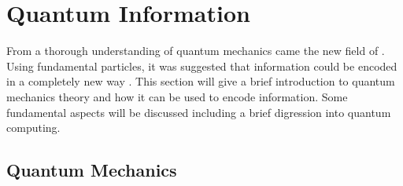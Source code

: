 %
%
%

\section{Quantum Information}

From a thorough understanding of quantum mechanics came the new field of . Using fundamental particles, it was suggested that information could be encoded in a completely new way \cite{manin1980computable, feynman1982simulating}. This section will give a brief introduction to quantum mechanics theory and how it can be used to encode information. Some fundamental aspects will be discussed including a brief digression into quantum computing.





%


\subsection{Quantum Mechanics}

